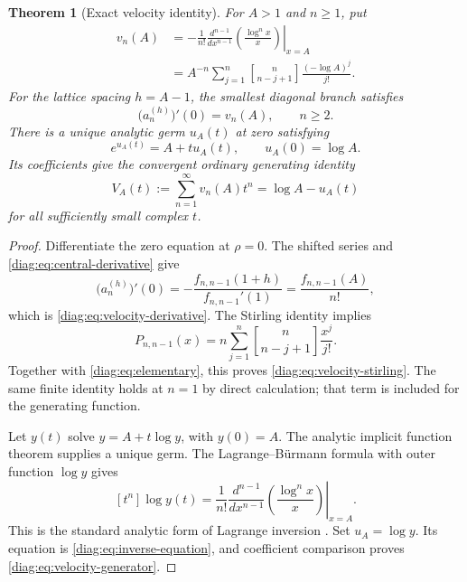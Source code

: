 \documentclass[11pt,a4paper]{article}
\newtheorem{theorem}{Theorem}[section]
\theoremstyle{definition}
\theoremstyle{remark}
\newcommand{\stirling}[2]{\genfrac{[}{]}{0pt}{}{#1}{#2}}
\numberwithin{equation}{section}
\begin{document}
\begin{theorem}[Exact velocity identity]\label{diag:thm:generator}
For $A>1$ and $n\geq1$, put
\begin{align}
 v_n(A)
  &=-\frac1{n!}\left.\frac{d^{n-1}}{dx^{n-1}}
                  \left(\frac{\log^n x}{x}\right)\right|_{x=A}
                  \label{diag:eq:velocity-derivative}\\
  &=A^{-n}\sum_{j=1}^n
       \stirling{n}{n-j+1}\frac{(-\log A)^j}{j!}.
                  \label{diag:eq:velocity-stirling}
\end{align}
For the lattice spacing $h=A-1$, the smallest diagonal branch satisfies
\begin{equation}\label{diag:eq:root-velocity}
 \bigl(a_n^{(h)}\bigr)'(0)=v_n(A),\qquad n\geq2.
\end{equation}
There is a unique analytic germ $u_A(t)$ at zero satisfying
\begin{equation}\label{diag:eq:inverse-equation}
 e^{u_A(t)}=A+t u_A(t),\qquad u_A(0)=\log A.
\end{equation}
Its coefficients give the convergent ordinary generating identity
\begin{equation}\label{diag:eq:velocity-generator}
 V_A(t):=\sum_{n=1}^{\infty}v_n(A)t^n=\log A-u_A(t)
\end{equation}
for all sufficiently small complex $t$.
\end{theorem}

\begin{proof}
Differentiate the zero equation at $\rho=0$.  The shifted series and
\eqref{diag:eq:central-derivative} give
\[
 \bigl(a_n^{(h)}\bigr)'(0)
   =-\frac{f_{n,n-1}(1+h)}{f_{n,n-1}'(1)}
   =\frac{f_{n,n-1}(A)}{n!},
\]
which is \eqref{diag:eq:velocity-derivative}.  The Stirling identity implies
\[
 P_{n,n-1}(x)
       =n\sum_{j=1}^n\stirling{n}{n-j+1}\frac{x^j}{j!}.
\]
Together with \eqref{diag:eq:elementary}, this proves
\eqref{diag:eq:velocity-stirling}.  The same finite identity holds at $n=1$
by direct calculation; that term is included for the generating function.

Let $y(t)$ solve $y=A+t\log y$, with $y(0)=A$.  The analytic implicit
function theorem supplies a unique germ.  The Lagrange--B\"urmann formula
with outer function $\log y$ gives
\[
 [t^n]\log y(t)
   =\frac1{n!}\left.\frac{d^{n-1}}{dx^{n-1}}
                        \left(\frac{\log^n x}{x}\right)\right|_{x=A}.
\]
This is the standard analytic form of Lagrange inversion
\cite{Gessel2016}.  Set $u_A=\log y$.  Its equation is
\eqref{diag:eq:inverse-equation}, and coefficient comparison proves
\eqref{diag:eq:velocity-generator}.
\end{proof}
\end{document}
